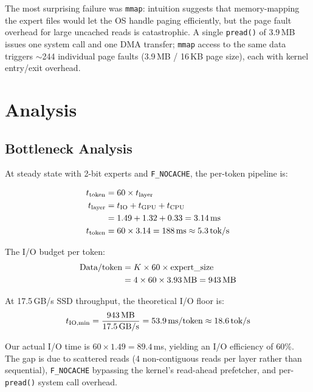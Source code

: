 \documentclass[11pt,twocolumn]{article}
\begin{document}
The most surprising failure was \texttt{mmap}: intuition suggests that memory-mapping the expert files would let the OS handle paging efficiently, but the page fault overhead for large uncached reads is catastrophic.
A single \texttt{pread()} of 3.9\,MB issues one system call and one DMA transfer; \texttt{mmap} access to the same data triggers $\sim$244 individual page faults (3.9\,MB / 16\,KB page size), each with kernel entry/exit overhead.

\section{Analysis}

\subsection{Bottleneck Analysis}

At steady state with 2-bit experts and \texttt{F\_NOCACHE}, the per-token pipeline is:

\begin{align}
t_\text{token} &= 60 \times t_\text{layer} \nonumber \\
t_\text{layer} &= t_\text{IO} + t_\text{GPU} + t_\text{CPU} \nonumber \\
               &= 1.49 + 1.32 + 0.33 = 3.14\text{\,ms} \nonumber \\
t_\text{token} &= 60 \times 3.14 = 188\text{\,ms} \approx 5.3\text{\,tok/s} \nonumber
\end{align}

The I/O budget per token:
\begin{align}
\text{Data/token} &= K \times 60 \times \text{expert\_size} \nonumber \\
                  &= 4 \times 60 \times 3.93\text{\,MB} = 943\text{\,MB} \nonumber
\end{align}

At 17.5\,GB/s SSD throughput, the theoretical I/O floor is:
\begin{equation}
t_\text{IO,min} = \frac{943\text{\,MB}}{17.5\text{\,GB/s}} = 53.9\text{\,ms/token} \approx 18.6\text{\,tok/s}
\end{equation}

Our actual I/O time is $60 \times 1.49 = 89.4$\,ms, yielding an I/O efficiency of 60\%.
The gap is due to scattered reads (4 non-contiguous reads per layer rather than sequential), \texttt{F\_NOCACHE} bypassing the kernel's read-ahead prefetcher, and per-\texttt{pread()} system call overhead.
\end{document}
